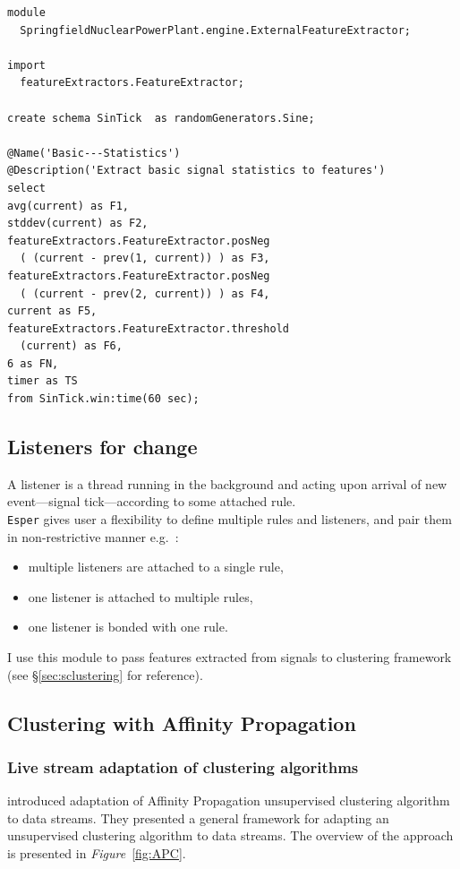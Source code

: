 \documentclass[11pt, letterpaper]{article}            %
\begin{document}
\vspace{1em}
\begin{lstlisting}
module
  SpringfieldNuclearPowerPlant.engine.ExternalFeatureExtractor;

import
  featureExtractors.FeatureExtractor;

create schema SinTick  as randomGenerators.Sine;

@Name('Basic---Statistics')
@Description('Extract basic signal statistics to features')
select
avg(current) as F1,
stddev(current) as F2,
featureExtractors.FeatureExtractor.posNeg
  ( (current - prev(1, current)) ) as F3,
featureExtractors.FeatureExtractor.posNeg
  ( (current - prev(2, current)) ) as F4,
current as F5,
featureExtractors.FeatureExtractor.threshold
  (current) as F6,
6 as FN,
timer as TS
from SinTick.win:time(60 sec);
\end{lstlisting}


\subsection{Listeners for change\label{sec:listeners}}
A listener is a thread running in the background and acting upon arrival of new event---signal tick---according to some attached rule.\\
\texttt{Esper} gives user a flexibility to define multiple rules and listeners, and pair them in non-restrictive manner e.g.\ :
\begin{itemize}
\item multiple listeners are attached to a single rule,
\item one listener is attached to multiple rules,
\item one listener is bonded with one rule.
\end{itemize}

\noindent I use this module to pass features extracted from signals to clustering framework (see §\ref{sec:sclustering} for reference).

\subsection{Clustering with Affinity Propagation\label{sec:sclustering}}

\subsubsection{Live stream adaptation of clustering algorithms\label{sec:livestream}}
\citep{zhang2013data} introduced adaptation of Affinity Propagation unsupervised clustering algorithm to data streams. They presented a general framework for adapting an unsupervised clustering algorithm to data streams. The overview of the approach is presented in \emph{Figure}~\ref{fig:APC}.\\
\end{document}

